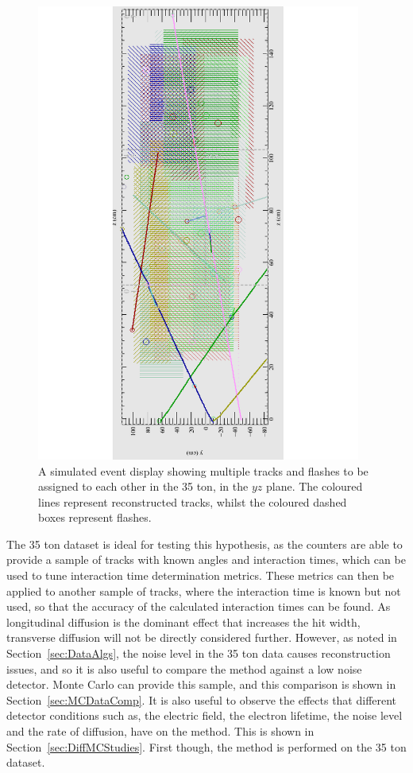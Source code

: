 \begin{figure}
  \centering
  \includegraphics[width=0.95\textwidth]{LotsOfTrackFlash}
  \caption[A simulated event display showing multiple tracks and flashes in the 35 ton]
          {A simulated event display showing multiple tracks and flashes to be assigned to each other in the 35 ton, in the $yz$ plane. The coloured lines represent reconstructed tracks, whilst the coloured dashed boxes represent flashes.}
          \label{fig:DiffLotsOfFlashes}
\end{figure}

The 35 ton dataset is ideal for testing this hypothesis, as the counters are able to provide a sample of tracks with known angles and interaction times, which can be used to tune interaction time determination metrics. These metrics can then be applied to another sample of tracks, where the interaction time is known but not used, so that the accuracy of the calculated interaction times can be found. As longitudinal diffusion is the dominant effect that increases the hit width, transverse diffusion will not be directly considered further. However, as noted in Section~\ref{sec:DataAlgs}, the noise level in the 35 ton data causes reconstruction issues, and so it is also useful to compare the method against a low noise detector. Monte Carlo can provide this sample, and this comparison is shown in Section~\ref{sec:MCDataComp}. It is also useful to observe the effects that different detector conditions such as, the electric field, the electron lifetime, the noise level and the rate of diffusion, have on the method. This is shown in Section~\ref{sec:DiffMCStudies}. First though, the method is performed on the 35 ton dataset.


